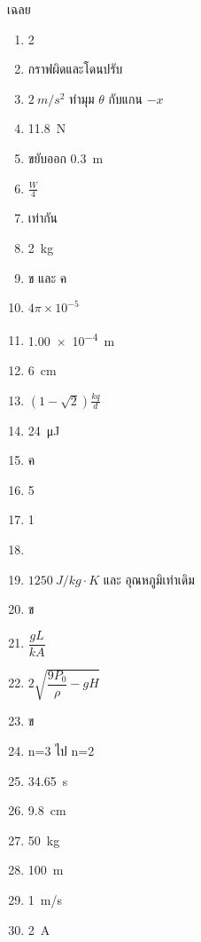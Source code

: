 \documentclass[a4paper,12pt]{article}
\begin{document}
\newpage
\begin{center}
	\Large{เฉลย}
\end{center}
\begin{enumerate}
	\item 2
	\item กราฟผิดและโดนปรับ
	\item \(\SI{2}{m/s^2}\) ทำมุม \(\theta\) กับแกน \(-x\)
	\item \SI{11.8}{N}
	\item ขยับออก \SI{0.3}{m}
	\item \(\frac{W}{4}\)
	\item เท่ากัน
	\item \SI{2}{kg}
	\item ข และ ค
	\item \(4\pi\times10^{-5}\)
	\item \SI{1.00e-4}{m}
	\item \SI{6}{cm}
	\item \((1-\sqrt{2})\frac{kq}{d}\)
	\item \SI{24}{\micro J}
	\item ค
	\item 5
	\item 1
	\item 
	\item \(\SI{1250}{J/kg\cdot K}\) และ อุณหภูมิเท่าเดิม
	\item ข
	\item \(\dfrac{gL}{kA}\)
	\item \(2\sqrt{\dfrac{9P_0}{\rho}-gH}\)
	\item ข
	\item n=3 ไป n=2
	\item \SI{34.65}{s}
	\item \SI{9.8}{cm}
	\item \SI{50}{kg}
	\item \SI{100}{m}
	\item \SI{1}{m/s}
	\item \SI{2}{A}
\end{enumerate}
\end{document}
